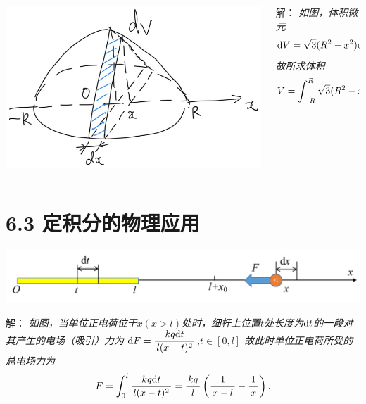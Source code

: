 \begin{frame}
	\linespread{1.5}
	\pause
	
	\bigskip
	
	\begin{columns}
		\begin{column}{.4\textwidth}
			\begin{center}
				\includegraphics[width=\textwidth]{./images/ch6/rtSp.jpg}
			\end{center}		
		\end{column}
		\begin{column}{.6\textwidth}
			\small 解：\it
			如图，体积微元
			$$\mathrm{d} V=\sqrt3(R^2-x^2)\mathrm{d} x,\;x\in[-R,R],$$
			故所求体积
			$$V=\displaystyle\int_{-R}^R\sqrt3(R^2-x^2)\mathrm{d} x=\displaystyle\frac{\,{4\sqrt3}\,}{\,{3}\,}R^3.$$
		\end{column}
	\end{columns}
\end{frame}

\section{6.3 定积分的物理应用}

\begin{frame}
	\linespread{1.5}
	\pause
	
	\begin{center}
		\includegraphics[width=.9\textwidth]{./images/ch6/eMove.pdf}
	\end{center}
	\small 解：\it
	如图，当单位正电荷位于$x(x>l)$处时，细杆上位置$t$处长度为$\mathrm{d} t$的一段对其产生的电场（吸引）力为
	$\mathrm{d} F=\displaystyle\frac{\,{kq\mathrm{d} t}\,}{\,{l(x-t)^2}\,}$,$t\in[0,l]$
	故此时单位正电荷所受的总电场力为
	$$F=\displaystyle\int_0^l\displaystyle\frac{\,{kq\mathrm{d} t}\,}{\,{l(x-t)^2}\,}=\displaystyle\frac{\,{kq}\,}{\,{l}\,}\left(\displaystyle\frac{\,{1}\,}{\,{x-l}\,}-\displaystyle\frac{\,{1}\,}{\,{x}\,}\right).$$
\end{frame}

